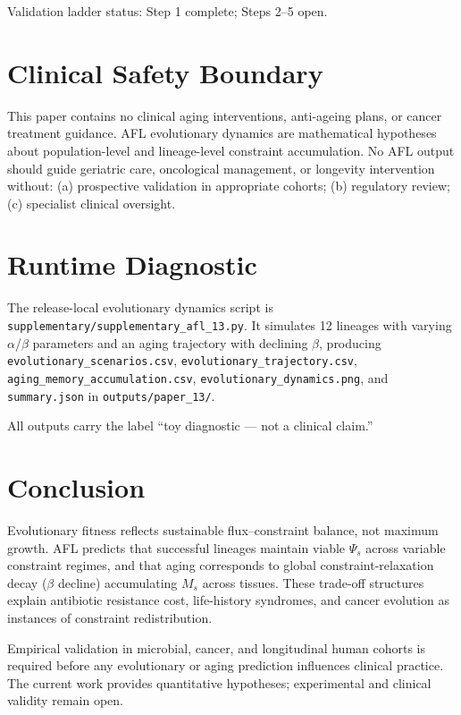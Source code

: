 \documentclass[11pt]{article}
\begin{document}
Validation ladder status: Step 1 complete; Steps 2--5 open.

\section{Clinical Safety Boundary}

This paper contains no clinical aging interventions, anti-ageing plans, or cancer treatment guidance. AFL evolutionary dynamics are mathematical hypotheses about population-level and lineage-level constraint accumulation. No AFL output should guide geriatric care, oncological management, or longevity intervention without: (a) prospective validation in appropriate cohorts; (b) regulatory review; (c) specialist clinical oversight.

\section{Runtime Diagnostic}

The release-local evolutionary dynamics script is \texttt{supplementary/supplementary\_afl\_13.py}. It simulates 12 lineages with varying $\alpha$/$\beta$ parameters and an aging trajectory with declining $\beta$, producing \texttt{evolutionary\_scenarios.csv}, \texttt{evolutionary\_trajectory.csv}, \texttt{aging\_memory\_accumulation.csv}, \texttt{evolutionary\_dynamics.png}, and \texttt{summary.json} in \texttt{outputs/paper\_13/}.

All outputs carry the label ``toy diagnostic --- not a clinical claim.''

\section{Conclusion}

Evolutionary fitness reflects sustainable flux--constraint balance, not maximum growth. AFL predicts that successful lineages maintain viable $\Psi_s$ across variable constraint regimes, and that aging corresponds to global constraint-relaxation decay ($\beta$ decline) accumulating $M_s$ across tissues. These trade-off structures explain antibiotic resistance cost, life-history syndromes, and cancer evolution as instances of constraint redistribution.

Empirical validation in microbial, cancer, and longitudinal human cohorts is required before any evolutionary or aging prediction influences clinical practice. The current work provides quantitative hypotheses; experimental and clinical validity remain open.
\end{document}
